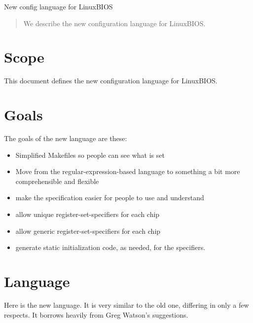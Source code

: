 		New config language for LinuxBIOS

\begin{abstract}
We describe the new configuration language for LinuxBIOS.
\end{abstract}

\section{Scope}
This document defines the new configuration language for LinuxBIOS.

\section{Goals}
The goals of the new language are these: 
\begin{itemize}
\item Simplified Makefiles so people can see what is set
\item Move from the regular-expression-based language to something
a bit more comprehensible and flexible
\item make the specification easier for people to use and understand
\item allow unique register-set-specifiers for each chip
\item allow generic register-set-specifiers for each chip
\item generate static initialization code, as needed, for the 
specifiers. 
\end{itemize}

\section{Language}
Here is the new language. It is very similar to the old one, differing
in only a few respects. It borrows heavily from Greg Watson's suggestions. 

